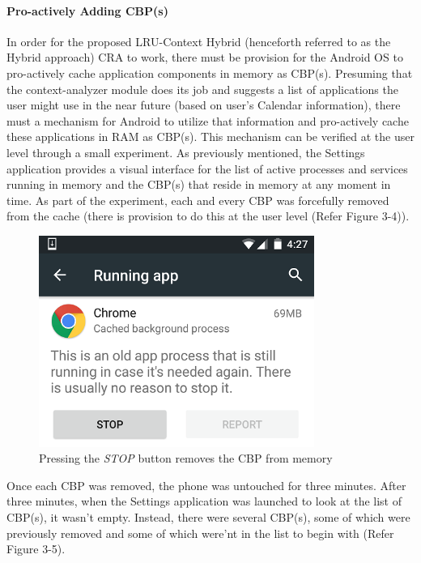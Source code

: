 \documentclass[12pt]{uthesis-v12}  %
\begin{document}
				\paragraph{Pro-actively Adding CBP(s)}
					In order for the proposed LRU-Context Hybrid (henceforth referred to as the Hybrid approach) CRA to work, there must be provision for the Android OS to pro-actively cache application components in memory as CBP(s). Presuming that the context-analyzer module does its job and suggests a list of applications the user might use in the near future (based on user's Calendar information), there must a mechanism for Android to utilize that information and pro-actively cache these applications in RAM as CBP(s). This mechanism can be verified at the user level through a small experiment. As previously mentioned, the Settings application provides a visual interface for the list of active processes and services running in memory and the CBP(s) that reside in memory at any moment in time. As part of the experiment, each and every CBP was forcefully removed from the cache (there is provision to do this at the user level (Refer Figure 3-4)). 
						
					\begin{figure}[!ht]
						\centering
						\includegraphics[width = 90mm]{images/removeCBP3.png}
						\caption[Remove CBP]
						{Pressing the {\em STOP} button removes the CBP from memory}
					\end{figure}					
					
					Once each CBP was removed, the phone was untouched for three minutes. After three minutes, when the Settings application was launched to look at the list of CBP(s), it wasn't empty. Instead, there were several CBP(s), some of which were previously removed and some of which were'nt in the list to begin with (Refer Figure 3-5). 
					
\end{document}
